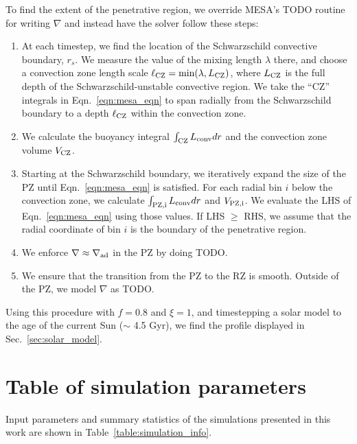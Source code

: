 \documentclass[twocolumn]{aastex631}
\newcommand{\gradad}{\ensuremath{\nabla_{\rm{ad}}}}
\newcommand{\justgrad}{\ensuremath{\nabla}}
\begin{document}
To find the extent of the penetrative region, we override MESA's TODO routine for writing $\justgrad$ and instead have the solver follow these steps:
\begin{enumerate}
\item At each timestep, we find the location of the Schwarzschild convective boundary, $r_s$.
We measure the value of the mixing length $\lambda$ there, and choose a convection zone length scale $\ell_{\rm{CZ}} = \text{min}(\lambda, L_{\rm{CZ}})$, where $L_{\rm{CZ}}$ is the full depth of the Schwarzschild-unstable convective region.
We take the ``CZ'' integrals in Eqn.~\ref{eqn:mesa_eqn} to span radially from the Schwarzschild boundary to a depth $\ell_{\rm{CZ}}$ within the convection zone.
\item We calculate the buoyancy integral $\int_{\rm{CZ}} L_{\rm{conv}} dr$ and the convection zone volume $V_{\rm{CZ}}$.
\item Starting at the Schwarzschild boundary, we iteratively expand the size of the PZ until Eqn.~\ref{eqn:mesa_eqn} is satisfied.
For each radial bin $i$ below the convection zone, we calculate $\int_{\rm{PZ},i}L_{\rm{conv}} dr$ and $V_{\rm{PZ},i}$.
We evaluate the LHS of Eqn.~\ref{eqn:mesa_eqn} using those values.
If LHS $\geq$ RHS, we assume that the radial coordinate of bin $i$ is the boundary of the penetrative region.
\item We enforce $\justgrad \approx \gradad$ in the PZ by doing TODO.
\item We ensure that the transition from the PZ to the RZ is smooth.
Outside of the PZ, we model $\justgrad$ as TODO.
\end{enumerate}

Using this procedure with $f = 0.8$ and $\xi = 1$, and timestepping a solar model to the age of the current Sun ($\sim$ 4.5 Gyr), we find the profile displayed in Sec.~\ref{sec:solar_model}.


\newpage
\section{Table of simulation parameters}
\label{app:simulation_table}
Input parameters and summary statistics of the simulations presented in this work are shown in Table~\ref{table:simulation_info}.
\end{document}
